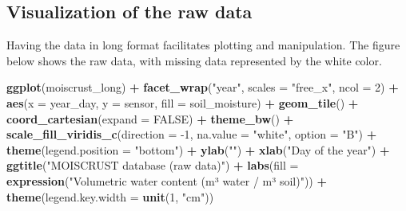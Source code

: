 \documentclass[]{article}
\newenvironment{Shaded}{\begin{snugshade}}{\end{snugshade}}
\newcommand{\DataTypeTok}[1]{\textcolor[rgb]{0.13,0.29,0.53}{#1}}
\newcommand{\DecValTok}[1]{\textcolor[rgb]{0.00,0.00,0.81}{#1}}
\newcommand{\KeywordTok}[1]{\textcolor[rgb]{0.13,0.29,0.53}{\textbf{#1}}}
\newcommand{\NormalTok}[1]{#1}
\newcommand{\OperatorTok}[1]{\textcolor[rgb]{0.81,0.36,0.00}{\textbf{#1}}}
\newcommand{\OtherTok}[1]{\textcolor[rgb]{0.56,0.35,0.01}{#1}}
\newcommand{\StringTok}[1]{\textcolor[rgb]{0.31,0.60,0.02}{#1}}
\begin{document}
\hypertarget{visualization-of-the-raw-data}{%
\subsection{Visualization of the raw
data}\label{visualization-of-the-raw-data}}

Having the data in long format facilitates plotting and manipulation.
The figure below shows the raw data, with missing data represented by
the white color.

\begin{Shaded}
\begin{Highlighting}[]
\KeywordTok{ggplot}\NormalTok{(moiscrust_long) }\OperatorTok{+}\StringTok{ }
\StringTok{  }\KeywordTok{facet_wrap}\NormalTok{(}\StringTok{"year"}\NormalTok{, }\DataTypeTok{scales =} \StringTok{"free_x"}\NormalTok{, }\DataTypeTok{ncol =} \DecValTok{2}\NormalTok{) }\OperatorTok{+}
\StringTok{  }\KeywordTok{aes}\NormalTok{(}\DataTypeTok{x =}\NormalTok{ year_day, }\DataTypeTok{y =}\NormalTok{ sensor, }\DataTypeTok{fill =}\NormalTok{ soil_moisture) }\OperatorTok{+}\StringTok{ }
\StringTok{  }\KeywordTok{geom_tile}\NormalTok{() }\OperatorTok{+}\StringTok{ }
\StringTok{  }\KeywordTok{coord_cartesian}\NormalTok{(}\DataTypeTok{expand =} \OtherTok{FALSE}\NormalTok{) }\OperatorTok{+}
\StringTok{  }\KeywordTok{theme_bw}\NormalTok{() }\OperatorTok{+}\StringTok{ }
\StringTok{  }\KeywordTok{scale_fill_viridis_c}\NormalTok{(}\DataTypeTok{direction =} \DecValTok{-1}\NormalTok{, }\DataTypeTok{na.value =} \StringTok{"white"}\NormalTok{, }\DataTypeTok{option =} \StringTok{"B"}\NormalTok{) }\OperatorTok{+}\StringTok{ }
\StringTok{  }\KeywordTok{theme}\NormalTok{(}\DataTypeTok{legend.position =} \StringTok{"bottom"}\NormalTok{) }\OperatorTok{+}\StringTok{ }
\StringTok{  }\KeywordTok{ylab}\NormalTok{(}\StringTok{""}\NormalTok{) }\OperatorTok{+}\StringTok{ }
\StringTok{  }\KeywordTok{xlab}\NormalTok{(}\StringTok{"Day of the year"}\NormalTok{) }\OperatorTok{+}
\StringTok{  }\KeywordTok{ggtitle}\NormalTok{(}\StringTok{"MOISCRUST database (raw data)"}\NormalTok{) }\OperatorTok{+}
\StringTok{  }\KeywordTok{labs}\NormalTok{(}\DataTypeTok{fill =} \KeywordTok{expression}\NormalTok{(}\StringTok{"Volumetric water content (m³ water / m³ soil)"}\NormalTok{)) }\OperatorTok{+}\StringTok{ }
\StringTok{  }\KeywordTok{theme}\NormalTok{(}\DataTypeTok{legend.key.width =} \KeywordTok{unit}\NormalTok{(}\DecValTok{1}\NormalTok{, }\StringTok{"cm"}\NormalTok{))}
\end{Highlighting}
\end{Shaded}
\end{document}
